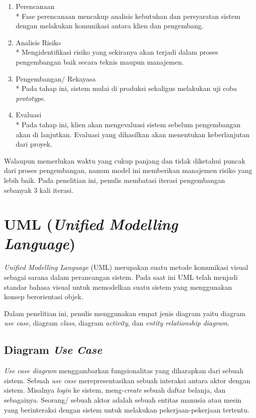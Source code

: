 \begin{enumerate}
	\item Perencanaan
		\\* Fase perencanaan mencakup analisis kebutuhan dan persyaratan sistem dengan melakukan komunikasi antara klien dan pengembang.
	\item Analisis Risiko
		\\* Mengidentifikasi risiko yang sekiranya akan terjadi dalam proses pengembangan baik secara teknis maupun manajemen.
	\item Pengembangan/ Rekayasa
		\\* Pada tahap ini, sistem mulai di produksi sekaligus melakukan uji coba \emph{prototype}.
	\item Evaluasi
		\\* Pada tahap ini, klien akan mengevaluasi sistem sebelum pengembangan akan di lanjutkan. Evaluasi yang dihasilkan akan menentukan keberlanjutan dari proyek.
\end{enumerate}

Walaupun memerlukan waktu yang cukup panjang dan tidak diketahui puncak dari proses pengembangan, namun model ini memberikan manajemen risiko yang lebih baik. Pada penelitian ini, penulis membatasi iterasi pengembangan sebanyak 3 kali iterasi.


\section{UML (\emph{Unified Modelling Language})}
\emph{Unified Modelling Language} (UML) merupakan suatu metode komunikasi visual sebagai sarana dalam perancangan sistem. Pada saat ini UML telah menjadi standar bahasa visual untuk memodelkan suatu sistem yang menggunakan konsep berorientasi objek.

Dalam penelitian ini, penulis menggunakan empat jenis diagram yaitu diagram \emph{use case}, diagram \emph{class}, diagram \emph{activity}, dan \textit{entity relationship diagram}.

\subsection{Diagram \emph{Use Case}} 

\emph{Use case diagram} menggambarkan fungsionalitas yang diharapkan dari sebuah sistem. Sebuah \emph{use case} merepresentasikan sebuah interaksi antara aktor dengan sistem. Misalnya \emph{login} ke sistem, meng-\emph{create} sebuah daftar belanja, dan sebagainya.  Seorang/ sebuah aktor adalah sebuah entitas manusia atau mesin yang berinteraksi dengan sistem untuk melakukan pekerjaan-pekerjaan tertentu.

